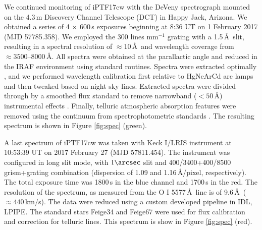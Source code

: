 \documentclass[twocolumn]{emulateapj}
\begin{document}
We continued monitoring of iPTF17cw with the DeVeny spectrograph mounted on the 4.3\,m
Discovery Channel Telescope (DCT) in Happy Jack, Arizona.  We obtained
a series of 4 $\times$ 600\,s exposures beginning at 8:36 UT on 1
February 2017 (MJD 57785.358).  We employed the 300 lines mm$^{-1}$ grating with a 
1.5\,\AA\ slit, resulting in a spectral resolution of $\approx 10$\,\AA\ and
wavelength coverage from $\approx 3500$--8000\,\AA.  All spectra 
were obtained at the parallactic angle \citep{f82} and
reduced in the IRAF environment using standard routines.  Spectra were
extracted optimally \citep{h86}, and we performed wavelength calibration
first relative to HgNeArCd arc lamps and then tweaked based on night
sky lines.  Extracted spectra were divided through by a smoothed
flux standard to remove narrowband ($< 50$\,\AA) instrumental effects
\citep{b99}.  Finally, telluric atmospheric absorption features were
removed using the continuum from spectrophotometric standards
\citep{wh88}.  The resulting spectrum is shown in Figure \ref{fig:spec} (green).

A last spectrum of iPTF17cw was taken with Keck I/LRIS instrument \citep{Oke1995} at 10:53:39 UT on 2017 February  27  (MJD 57811.454). 
The instrument was configured in long slit mode, with $1\arcsec$ slit and 400/3400+400/8500 grism+grating combination 
(dispersion of 1.09 and 1.16\,\AA/pixel, respectively). The total exposure time was 1800\,s in the blue channel and 1700\,s in the red. 
The resolution of the spectrum, as measured from the O I 5577\,\AA\ line is of 9.6\,\AA\ ($\approx 440$\,km/s).
The data were reduced using a custom developed pipeline in IDL, LPIPE. The standard stars Feige34 and Feige67 
were used for flux calibration and correction for telluric lines. This spectrum is show in Figure \ref{fig:spec} (red).

\end{document}
